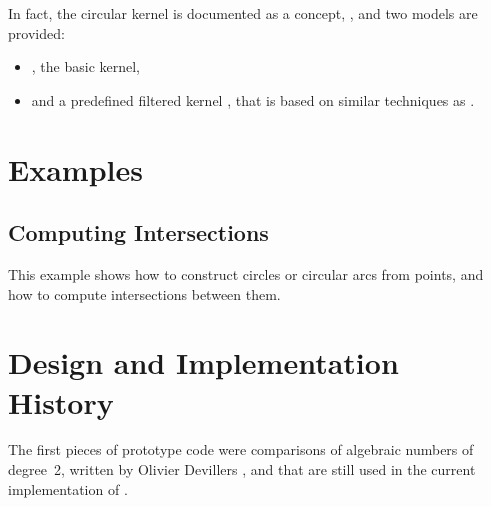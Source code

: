 In fact, the circular kernel is documented as a concept, , 
and two models are provided: 
\begin{itemize}
\item {} , the basic kernel, 
\item {} and
a predefined filtered kernel , 
that is based on similar techniques as 
. 
\end{itemize}


\section{Examples}

	\subsection{Computing Intersections} 

This example shows how to construct circles or circular arcs from
points, and how to compute intersections between them.


\section{Design and Implementation History}

The first pieces of prototype code were comparisons of algebraic
numbers of degree~2, written by Olivier Devillers
\cite{cgal:dfmt-amafe-00,cgal:dfmt-amafe-02}, and that are still used
in the current implementation of .

